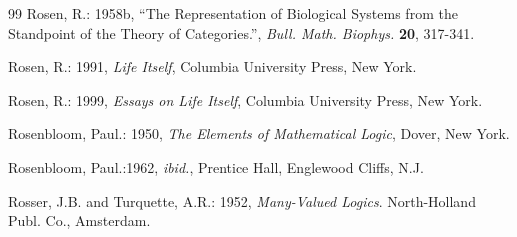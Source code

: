 \documentclass[12pt]{article}
\theoremstyle{plain}
\theoremstyle{definition}
\begin{document}
\begin{thebibliography} {99}
Rosen, R.: 1958b, ``The Representation of Biological Systems from the Standpoint of the Theory of Categories.'',
\emph{Bull. Math. Biophys.} \textbf{20}, 317-341.

Rosen, R.: 1991, \emph{Life Itself}, Columbia University Press, New York.

Rosen, R.: 1999, \emph{Essays on Life Itself}, Columbia University Press, New York.

Rosenbloom, Paul.: 1950, \emph{The Elements of Mathematical Logic}, Dover, New York.

Rosenbloom, Paul.:1962, \emph{ibid.}, Prentice Hall, Englewood Cliffs, N.J.

Rosser, J.B. and Turquette, A.R.: 1952, \emph{Many-Valued Logics}. North-Holland Publ. Co., Amsterdam.

\end{thebibliography}

\end{document}

